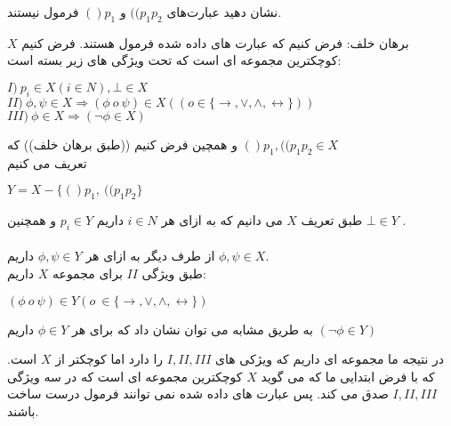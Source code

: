 نشان دهید عبارت‌های $((p_1p_2$ و $()p_1$ فرمول نیستند.
\begin{ans}
    برهان خلف: فرض کنیم که عبارت های داده شده فرمول هستند. فرض کنیم 
    $X$
    کوچکترین مجموعه ای است که تحت ویژگی های زیر بسته است:
    \begin{flushleft}
        $I) \ p_i \in X(i \in N), \bot \in X$
        \\
        $II) \ \phi,\psi \in X \Rightarrow (\phi \ o \ \psi) \in X ((o \in \{\rightarrow, \vee, \wedge, \leftrightarrow \}))$
        \\
        $III) \ \phi \in X \Rightarrow (\neg \phi \in X)$
        
    \end{flushleft}
    و همچین فرض کنیم ((طبق برهان خلف)) که 
    $()p_1, ((p_1p_2 \in X$
    \\
    تعریف می کنیم 
    \begin{flushleft}
        $Y = X - \{()p_1, \ ((p_1p_2\}$
    \end{flushleft}

    طبق تعریف 
    $X$
    می دانیم که به ازای هر 
    $i \in N$
    داریم 
    $p_i \in Y$
    و همچنین
    $\bot \in Y$
    .
    \\
    \\
    از طرف دیگر به ازای هر 
    $\phi,\psi \in Y$
    داریم 
    $\phi, \psi \in X$.
    \\
    طبق ویژگی 
    $II$
    برای مجموعه 
    $X$
    داریم:
    \begin{flushleft}
        $(\phi \ o \ \psi) \in Y (o \ \in \{\rightarrow, \vee, \wedge, \leftrightarrow\})$
    \end{flushleft}

    به طریق مشابه می توان نشان داد که برای هر 
    $\phi \in Y$
    داریم 
    $(\neg\phi\in Y)$

    در نتیجه ما مجموعه ای داریم که ویژکی های 
    $I,II, III$
    را دارد اما کوچکتر از 
    $X$
    است. که با فرض ابتدایی ما که می گوید
    $X$
    کوچکترین مجموعه ای است که در سه ویژگی 
    $I,II,III$
    صدق می کند. 
    پس عبارت های داده شده نمی توانند فرمول درست ساخت باشند.
\end{ans}
